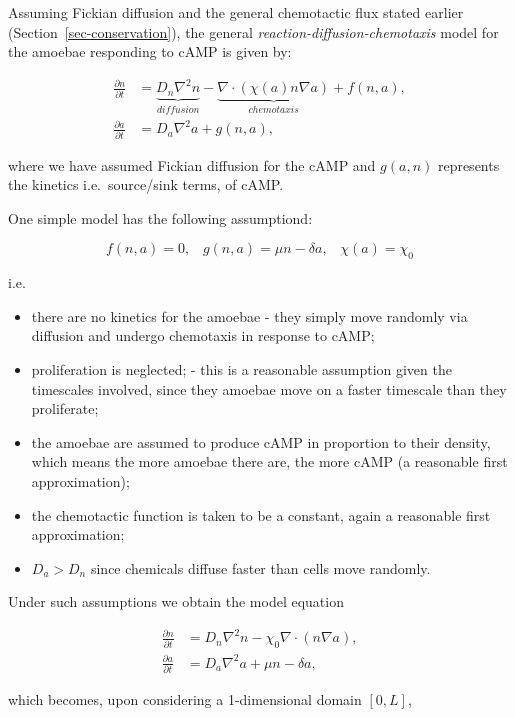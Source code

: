\documentclass[
  letterpaper,
  DIV=11,
  numbers=noendperiod]{scrreprt}
\theoremstyle{plain}
\theoremstyle{definition}
\theoremstyle{plain}
\theoremstyle{remark}
\begin{document}
Assuming Fickian diffusion and the general chemotactic flux stated
earlier (Section~\ref{sec-conservation}), the general
\emph{reaction-diffusion-chemotaxis} model for the amoebae responding to
cAMP is given by:

\[
\begin{aligned}
\frac{\partial n}{\partial  t} &=  \underbrace{D_n \nabla^2 n}_{diffusion} - \underbrace{\nabla \cdot \left( \chi(a) n \nabla a \right)}_{chemotaxis} + f(n,a),   \\
\frac{\partial a}{\partial  t} & =   D_a \nabla^2 a + g(n,a), 
\end{aligned}
\]

where we have assumed Fickian diffusion for the cAMP and \(g(a,n)\)
represents the kinetics i.e.~source/sink terms, of cAMP.

One simple model has the following assumptiond:

\[f(n,a) = 0, \;\;\; g(n,a) = \mu n - \delta a, \;\;\; \chi (a) = \chi_0\]

i.e.~

\begin{itemize}
\item
  there are no kinetics for the amoebae - they simply move randomly via
  diffusion and undergo chemotaxis in response to cAMP;
\item
  proliferation is neglected; - this is a reasonable assumption given
  the timescales involved, since they amoebae move on a faster timescale
  than they proliferate;
\item
  the amoebae are assumed to produce cAMP in proportion to their
  density, which means the more amoebae there are, the more cAMP (a
  reasonable first approximation);
\item
  the chemotactic function is taken to be a constant, again a reasonable
  first approximation;
\item
  \(D_a > D_n\) since chemicals diffuse faster than cells move randomly.
\end{itemize}

Under such assumptions we obtain the model equation

\[
\begin{aligned}
\frac{\partial n}{\partial  t} & =  D_n \nabla^2 n - \chi_0 \nabla \cdot \left( n \nabla a \right), \\
\frac{\partial a}{\partial  t} & =   D_a \nabla^2 a +  \mu n - \delta a,
\end{aligned}
\]

which becomes, upon considering a 1-dimensional domain \([0,L]\),
\end{document}
